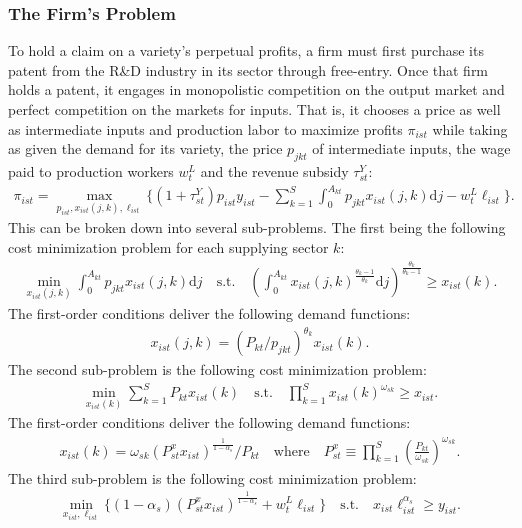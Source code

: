 \documentclass[12pt]{article}
\begin{document}
\subsubsection{The Firm's Problem}
\label{appendix:firm problem}

To hold a claim on a variety's perpetual profits, a firm must first purchase its patent from the R\&D industry in its sector through free-entry. Once that firm holds a patent, it engages in monopolistic competition on the output market and perfect competition on the markets for inputs. That is, it chooses a price as well as intermediate inputs and production labor to maximize profits $\pi_{ist}$ while taking as given the demand for its variety, the price $p_{jkt}$ of intermediate inputs, the wage paid to production workers $w_t^L$ and the revenue subsidy $\tau_{st}^Y$:
\begin{align*}
\pi_{ist} = \max_{p_{ist}, x_{ist}(j, k), \ell_{ist}}\{(1 + \tau_{st}^Y) p_{ist} y_{ist} - \sum_{k = 1}^S \int_0^{A_{kt}} p_{jkt} x_{ist}(j, k) \text{d}j - w_t^L \ell_{ist}\}.
\end{align*}
This can be broken down into several sub-problems. The first being the following cost minimization problem for each supplying sector $k$:
\begin{align*}
\min_{x_{ist}(j, k)} \int_0^{A_{kt}} p_{jkt} x_{ist}(j, k) \text{d}j \quad \text{s.t.} \quad \left(\int_0^{A_{kt}} x_{ist}(j, k)^{\frac{\theta_k - 1}{\theta_k}} \text{d}j\right)^{\frac{\theta_k}{\theta_k - 1}} \geq x_{ist}(k).
\end{align*}
The first-order conditions deliver the following demand functions:
\begin{align*}
x_{ist}(j, k) = (P_{kt} / p_{jkt})^{\theta_k} x_{ist}(k).
\end{align*}
The second sub-problem is the following cost minimization problem:
\begin{align*}
\min_{x_{ist}(k)} \sum_{k = 1}^S P_{kt} x_{ist}(k) \quad \text{s.t.} \quad \prod_{k = 1}^S x_{ist}(k)^{\omega_{sk}} \geq x_{ist}.
\end{align*}
The first-order conditions deliver the following demand functions:
\begin{align*}
x_{ist}(k) = \omega_{sk} (P_{st}^x x_{ist})^{\frac{1}{1 - \alpha_s}} / P_{kt} \quad \text{where} \quad P_{st}^x \equiv \prod_{k = 1}^S \left(\frac{P_{kt}}{\omega_{sk}}\right)^{\omega_{sk}}.
\end{align*}
The third sub-problem is the following cost minimization problem:
\begin{align*}
\min_{x_{ist}, \ell_{ist}}\{(1 - \alpha_s) (P_{st}^x x_{ist})^{\frac{1}{1 - \alpha_s}} + w_t^L \ell_{ist}\} \quad \text{s.t.} \quad x_{ist} \ell_{ist}^{\alpha_s} \geq y_{ist}.
\end{align*}
\end{document}
